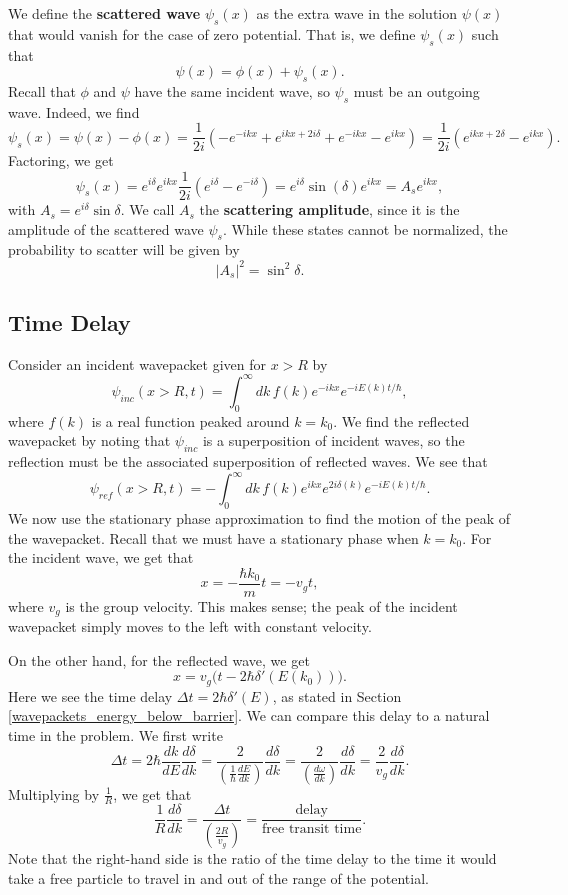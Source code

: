 We define the \textbf{scattered wave} $\psi_s(x)$ as the extra wave in the solution $\psi(x)$ that would vanish for the case of zero potential. That is, we define $\psi_s(x)$ such that $$\psi(x)=\phi(x)+\psi_s(x).$$Recall that $\phi$ and $\psi$ have the same incident wave, so $\psi_s$ must be an outgoing wave. Indeed, we find $$\psi_s(x)=\psi(x)-\phi(x)=\frac{1}{2i}(-e^{-ikx}+e^{ikx+2i\delta}+e^{-ikx}-e^{ikx})=\frac{1}{2i}(e^{ikx+2\delta}-e^{ikx}).$$Factoring, we get $$\psi_s(x)=e^{i\delta}e^{ikx}\frac{1}{2i}(e^{i\delta}-e^{-i\delta})=e^{i\delta}\sin(\delta)e^{ikx}=A_se^{ikx},$$with $A_s=e^{i\delta}\sin\delta$. We call $A_s$ the \textbf{scattering amplitude}, since it is the amplitude of the scattered wave $\psi_s$. While these states cannot be normalized, the probability to scatter will be given by $$|A_s|^2=\sin^2\delta.$$

\subsection{Time Delay}\label{time_delay}

Consider an incident wavepacket given for $x>R$ by $$\psi_{inc}(x>R,t)=\int_0^\infty dk\,f(k)e^{-ikx}e^{-iE(k)t/\hbar},$$where $f(k)$ is a real function peaked around $k=k_0$. We find the reflected wavepacket by noting that $\psi_{inc}$ is a superposition of incident waves, so the reflection must be the associated superposition of reflected waves. We see that $$\psi_{ref}(x>R,t)=-\int_0^\infty dk\,f(k)e^{ikx}e^{2i\delta(k)}e^{-iE(k)t/\hbar}.$$We now use the stationary phase approximation to find the motion of the peak of the wavepacket. Recall that we must have a stationary phase when $k=k_0$. For the incident wave, we get that $$x=-\frac{\hbar k_0}{m}t=-v_gt,$$where $v_g$ is the group velocity. This makes sense; the peak of the incident wavepacket simply moves to the left with constant velocity. 

On the other hand, for the reflected wave, we get $$x=v_g\bigg(t-2\hbar\delta'(E(k_0))\bigg).$$Here we see the time delay $\Delta t=2\hbar\delta'(E)$, as stated in Section \ref{wavepackets_energy_below_barrier}. We can compare this delay to a natural time in the problem. We first write $$\Delta t=2\hbar\frac{dk}{dE}\frac{d\delta}{dk}=\frac{2}{(\frac{1}{\hbar}\frac{dE}{dk})}\frac{d\delta}{dk}=\frac{2}{(\frac{d\omega}{dk})}\frac{d\delta}{dk}=\frac{2}{v_g}\frac{d\delta}{dk}.$$Multiplying by $\frac{1}{R}$, we get that $$\frac{1}{R}\frac{d\delta}{dk}=\frac{\Delta t}{(\frac{2R}{v_g})}=\frac{\text{delay}}{\text{free transit time}}.$$Note that the right-hand side is the ratio of the time delay to the time it would take a free particle to travel in and out of the range of the potential.

